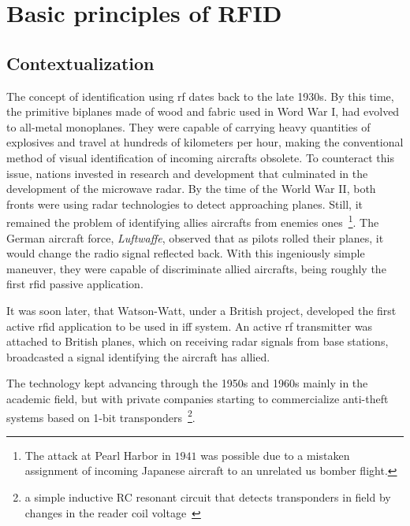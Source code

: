 \chapter{Basic principles of RFID}

\section{Contextualization} \label{sec:contextualization}

The concept of identification using \ac{rf} dates back to the late 1930s.
By this time, the primitive biplanes made of wood and fabric used in Word War I, had evolved to all-metal monoplanes. They were capable of carrying heavy quantities of explosives and travel at hundreds of kilometers per hour, making the conventional method of visual identification of incoming aircrafts obsolete.
To counteract this issue, nations invested in research and development that culminated in the development of the microwave radar.
By the time of the World War II, both fronts were using radar technologies to detect approaching planes. 
Still, it remained the problem of identifying allies aircrafts from enemies ones~\footnote{The attack at Pearl Harbor in $1941$ was possible due to a mistaken assignment of incoming Japanese aircraft to an unrelated \ac{us} bomber flight.}.
The German aircraft force, \emph{Luftwaffe}, observed that as pilots rolled their planes, it would change the radio signal reflected back. With this ingeniously simple maneuver, they were capable of discriminate allied aircrafts, being roughly the first \ac{rfid} passive application.~\cite{dobkinRFRFIDSecond2012}

It was soon later, that Watson-Watt, under a British project, developed the first active \ac{rfid} application to be used in \ac{iff} system. An active \ac{rf} transmitter was attached to British planes, which on receiving radar signals from base stations, broadcasted a signal identifying the aircraft has allied.~\cite{HistoryRFIDTechnology}


The technology kept advancing through the 1950s and 1960s mainly in the academic field, but with private companies starting to commercialize anti-theft systems based on 1-bit transponders~\footnote{a simple inductive RC resonant circuit that detects transponders in field by changes in the reader coil voltage~\cite{andreventuradacruzmarnotozuqueteIdentificacaoPorRFID2018}}.

